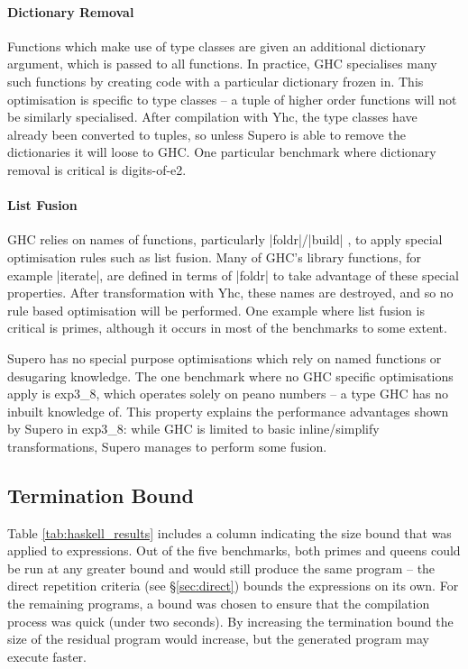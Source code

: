 \documentclass{llncs}
\begin{document}
\paragraph{Dictionary Removal} Functions which make use of type classes are given an additional dictionary argument, which is passed to all functions. In practice, GHC specialises many such functions by creating code with a particular dictionary frozen in. This optimisation is specific to type classes -- a tuple of higher order functions will not be similarly specialised. After compilation with Yhc, the type classes have already been converted to tuples, so unless Supero is able to remove the dictionaries it will loose to GHC. One particular benchmark where dictionary removal is critical is digits-of-e2.

\paragraph{List Fusion} GHC relies on names of functions, particularly |foldr|/|build| \cite{spj:rules}, to apply special optimisation rules such as list fusion. Many of GHC's library functions, for example |iterate|, are defined in terms of |foldr| to take advantage of these special properties. After transformation with Yhc, these names are destroyed, and so no rule based optimisation will be performed. One example where list fusion is critical is primes, although it occurs in most of the benchmarks to some extent.

Supero has no special purpose optimisations which rely on named functions or desugaring knowledge. The one benchmark where no GHC specific optimisations apply is exp3\_8, which operates solely on peano numbers -- a type GHC has no inbuilt knowledge of. This property explains the performance advantages shown by Supero in exp3\_8: while GHC is limited to basic inline/simplify transformations, Supero manages to perform some fusion.

\subsection{Termination Bound}
\label{sec:results_bound}

Table \ref{tab:haskell_results} includes a column indicating the size bound that was applied to expressions. Out of the five benchmarks, both primes and queens could be run at any greater bound and would still produce the same program -- the direct repetition criteria (see \S\ref{sec:direct}) bounds the expressions on its own. For the remaining programs, a bound was chosen to ensure that the compilation process was quick (under two seconds). By increasing the termination bound the size of the residual program would increase, but the generated program may execute faster.
\end{document}
